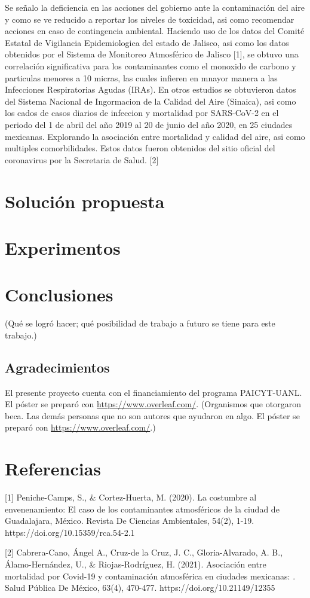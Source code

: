 \documentclass{sciposter}
\begin{document}
\begin{multicols}{2}
Se señalo la deficiencia en las acciones del gobierno ante la contaminación del aire y como se ve reducido a reportar los niveles de toxicidad, asi como recomendar acciones en caso de contingencia ambiental. Haciendo uso de los datos del Comité Estatal de Vigilancia Epidemiologica del estado de Jalisco, asi como los datos obtenidos por el Sistema de Monitoreo Atmosférico de Jalisco [1], se obtuvo una correlación significativa para los contaminantes como el monoxido de carbono y particulas menores a 10 micras, las cuales infieren en mnayor manera a las Infecciones Respiratorias Agudas (IRAs). 
En otros estudios se obtuvieron datos del Sistema Nacional de Ingormacion de la Calidad del Aire (Sinaica), asi como los cados de casos diarios de infeccion y mortalidad por SARS-CoV-2 en el periodo del 1 de abril del año 2019 al 20 de junio del año 2020, en 25 ciudades mexicanas. Explorando la asociación entre mortalidad y calidad del aire, asi como multiples comorbilidades. Estos datos fueron obtenidos del sitio oficial del coronavirus por la Secretaria de Salud. [2] 

\section{Solución propuesta}

\section{Experimentos}

\section{Conclusiones}

(Qué se logró hacer; qué posibilidad de trabajo a futuro se tiene para este trabajo.)

\subsection*{Agradecimientos}

El presente proyecto cuenta con el financiamiento del programa PAICYT-UANL.\\
El póster se preparó con \url{https://www.overleaf.com/}.
(Organismos que otorgaron beca. Las demás personas que no son autores que ayudaron en algo. El póster se preparó con \url{https://www.overleaf.com/}.)

\end{multicols}

\section{Referencias}
[1] Peniche-Camps, S., & Cortez-Huerta, M. (2020). La costumbre al envenenamiento: El caso de los contaminantes atmosféricos de la ciudad de Guadalajara, México. Revista De Ciencias Ambientales, 54(2), 1-19. https://doi.org/10.15359/rca.54-2.1

[2] Cabrera-Cano, Ángel A., Cruz-de la Cruz, J. C., Gloria-Alvarado, A. B., Álamo-Hernández, U., & Riojas-Rodríguez, H. (2021). Asociación entre mortalidad por Covid-19 y contaminación atmosférica en ciudades mexicanas: . Salud Pública De México, 63(4), 470-477. https://doi.org/10.21149/12355 
\end{document}
